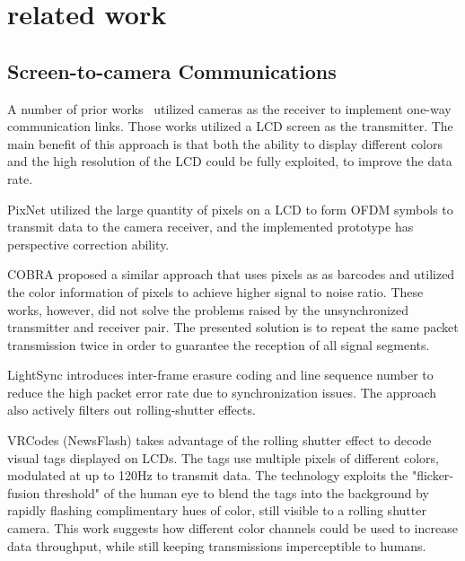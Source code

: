 \section{related work}

\subsection{Screen-to-camera Communications}
A number of prior works~\cite{perli2010pixnet,hao2012cobra,hu2013lightsync} utilized cameras as the receiver to implement one-way communication links. Those works utilized a LCD screen as the transmitter. The main benefit of this approach is that both the ability to display different colors and the high resolution of the LCD could be fully exploited, to improve the data rate.

PixNet \cite{perli2010pixnet} utilized the large quantity of pixels on a LCD to form OFDM symbols to transmit data to the camera receiver, and the implemented prototype has perspective correction ability.

COBRA \cite{hao2012cobra} proposed a similar approach that uses pixels as as barcodes and utilized the color information of pixels to achieve higher signal to noise ratio.
These works, however, did not solve the problems raised by the unsynchronized transmitter and receiver pair. The presented solution is to repeat the same packet transmission twice in order to guarantee the reception of all signal segments.

LightSync \cite{hu2013lightsync} introduces inter-frame erasure coding and line sequence number to reduce the high packet error rate due to synchronization issues. The approach also actively filters out rolling-shutter effects.

VRCodes (NewsFlash) \cite{vrcodes} takes advantage of the rolling shutter effect to decode visual tags displayed on LCDs. The tags use multiple pixels of different colors, modulated at up to 120Hz to transmit data. The technology exploits the "flicker-fusion threshold" of the human eye to blend the tags into the background by rapidly flashing complimentary hues of color, still visible to a rolling shutter camera. This work suggests how different color channels could be used to increase data throughput, while still keeping transmissions imperceptible to humans.

